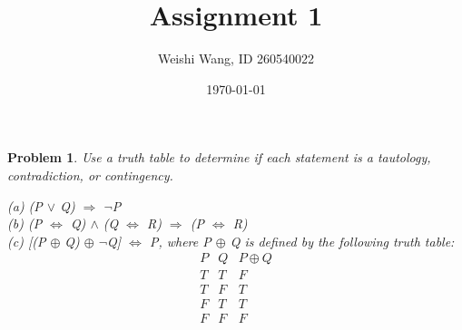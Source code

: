 \documentclass{article}
\newtheorem{problem}{Problem}
\theoremstyle{definition}
\begin{document}
 \title{Assignment 1} 

\author{Weishi Wang, ID 260540022} 

\date{\today}

\maketitle

\begin{problem} 

Use a truth table to determine if each statement is a tautology, contradiction, or contingency.

(a) (P \(\vee\) Q) \(\Rightarrow\) \(\neg\)P \\

(b) (P \(\Leftrightarrow\) Q) \(\wedge\) (Q \(\Leftrightarrow\) R) \(\Rightarrow\) (P \(\Leftrightarrow\) R)\\

(c) [(P \(\oplus\) Q) \(\oplus\) \(\neg\)Q] \(\Leftrightarrow\) P, where P \(\oplus\) Q is defined by the following truth table:\\

\begin{displaymath}
\begin{array}{ c|c|c }
P & Q & P \oplus Q \\ %
\hline %
T & T & F\\
T & F & T\\
F & T & T\\
F & F & F\\
\end{array}
\end{displaymath}
\\
\end{problem}
\end{document}
